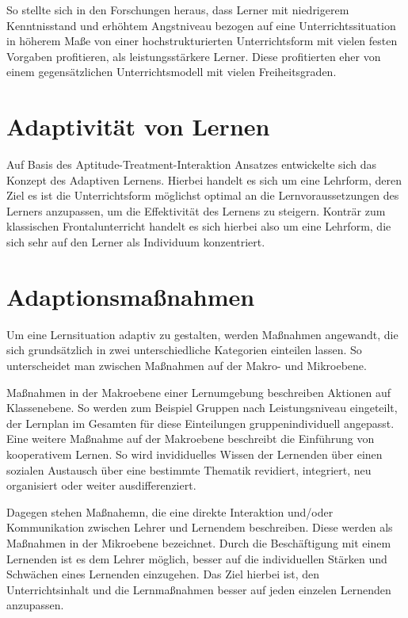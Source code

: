 So stellte sich in den Forschungen heraus, dass Lerner mit niedrigerem Kenntnisstand und erhöhtem Angstniveau bezogen auf
eine Unterrichtssituation in höherem Maße von einer hochstrukturierten Unterrichtsform mit vielen festen Vorgaben profitieren,
als leistungsstärkere Lerner. Diese profitierten eher von einem gegensätzlichen Unterrichtsmodell mit vielen Freiheitsgraden.
\cite[S.65]{hasselhornlernverlaufsdiagnostik}

\section{Adaptivität von Lernen}
Auf Basis des Aptitude-Treatment-Interaktion Ansatzes entwickelte sich das Konzept des Adaptiven Lernens.
Hierbei handelt es sich um eine Lehrform, deren Ziel es ist die Unterrichtsform möglichst optimal an die Lernvoraussetzungen
des Lerners anzupassen, um die Effektivität des Lernens zu steigern. Konträr zum klassischen Frontalunterricht handelt
es sich hierbei also um eine Lehrform, die sich sehr auf den Lerner als Individuum konzentriert.

\section{Adaptionsmaßnahmen}
Um eine Lernsituation adaptiv zu gestalten, werden Maßnahmen angewandt, die sich grundsätzlich in zwei
unterschiedliche Kategorien einteilen lassen. So unterscheidet man zwischen Maßnahmen auf der Makro- und Mikroebene.

Maßnahmen in der Makroebene einer Lernumgebung beschreiben Aktionen auf Klassenebene.
So werden zum Beispiel Gruppen nach Leistungsniveau eingeteilt, der Lernplan im Gesamten für
diese Einteilungen gruppenindividuell angepasst. Eine weitere Maßnahme auf der Makroebene beschreibt
die Einführung von kooperativem Lernen. So wird invididuelles Wissen der Lernenden über einen sozialen Austausch
über eine bestimmte Thematik revidiert, integriert, neu organisiert oder weiter ausdifferenziert.

Dagegen stehen Maßnahemn, die eine direkte Interaktion und/oder Kommunikation zwischen Lehrer und Lernendem beschreiben.
Diese werden als Maßnahmen in der Mikroebene bezeichnet. Durch die Beschäftigung mit einem Lernenden
ist es dem Lehrer möglich, besser auf die individuellen Stärken und Schwächen eines Lernenden einzugehen.
Das Ziel hierbei ist, den Unterrichtsinhalt und die Lernmaßnahmen besser auf jeden einzelen Lernenden anzupassen.


